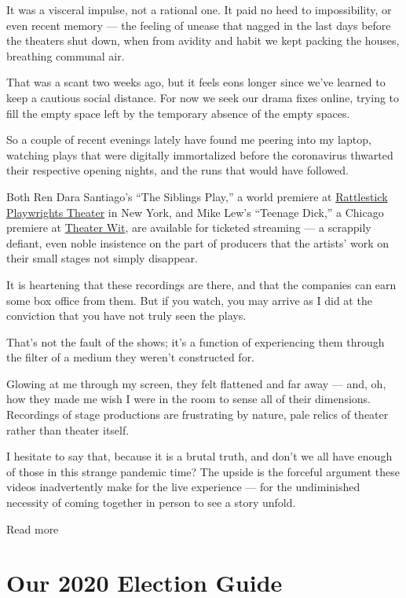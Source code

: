 It was a visceral impulse, not a rational one. It paid no heed to
impossibility, or even recent memory --- the feeling of unease that
nagged in the last days before the theaters shut down, when from avidity
and habit we kept packing the houses, breathing communal air.

That was a scant two weeks ago, but it feels eons longer since we've
learned to keep a cautious social distance. For now we seek our drama
fixes online, trying to fill the empty space left by the temporary
absence of the empty spaces.

So a couple of recent evenings lately have found me peering into my
laptop, watching plays that were digitally immortalized before the
coronavirus thwarted their respective opening nights, and the runs that
would have followed.

Both Ren Dara Santiago's ``The Siblings Play,'' a world premiere at
\href{https://www.rattlestick.org/}{Rattlestick Playwrights Theater} in
New York, and Mike Lew's ``Teenage Dick,'' a Chicago premiere at
\href{https://www.theaterwit.org/}{Theater Wit}, are available for
ticketed streaming --- a scrappily defiant, even noble insistence on the
part of producers that the artists' work on their small stages not
simply disappear.

It is heartening that these recordings are there, and that the companies
can earn some box office from them. But if you watch, you may arrive as
I did at the conviction that you have not truly seen the plays.

That's not the fault of the shows; it's a function of experiencing them
through the filter of a medium they weren't constructed for.

Glowing at me through my screen, they felt flattened and far away ---
and, oh, how they made me wish I were in the room to sense all of their
dimensions. Recordings of stage productions are frustrating by nature,
pale relics of theater rather than theater itself.

I hesitate to say that, because it is a brutal truth, and don't we all
have enough of those in this strange pandemic time? The upside is the
forceful argument these videos inadvertently make for the live
experience --- for the undiminished necessity of coming together in
person to see a story unfold.

Read more

\hypertarget{our-2020-election-guide}{%
\section{Our 2020 Election Guide}\label{our-2020-election-guide}}


